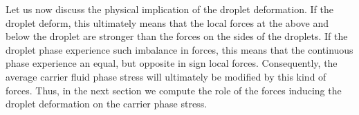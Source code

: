 Let us now discuss the physical implication of the droplet deformation. 
If the droplet deform, this ultimately means that the local forces at the above and below the droplet are stronger than the forces on the sides of the droplets. 
If the droplet phase experience such imbalance in forces, this means that the continuous phase experience an equal, but opposite in sign local forces. 
Consequently, the average carrier fluid phase stress will ultimately be modified by this kind of forces. 
Thus, in the next section we compute the role of the forces inducing the droplet deformation on the carrier phase stress. 




